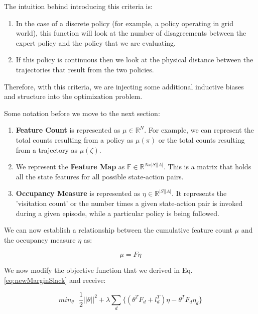 \documentclass[11pt]{article}
\begin{document}
The intuition behind introducing this criteria is:

\begin{enumerate}
    \item In the case of a discrete policy (for example, a policy operating in grid world), this function will look at the number of disagreements between the expert policy and the policy that we are evaluating.
    \item If this policy is continuous then we look at the physical distance between the trajectories that result from the two policies.
\end{enumerate}
 
Therefore, with this criteria, we are injecting some additional inductive biases and structure into the optimization problem.

Some notation before we move to the next section:

\begin{enumerate}
    \item \textbf{Feature Count} is represented as $\mu \in \mathbb{R}^N$. For example, we can represent the total counts resulting from a policy as $\mu(\pi)$ or the total counts resulting from a trajectory as $\mu(\zeta)$.
    \item We represent the \textbf{Feature Map} as $\mathbb{F} \in \mathbb{R}^{N x |S||A|}$. This is a matrix that holds all the state features for all possible state-action pairs.
    \item \textbf{Occupancy Measure} is represented as $\eta \in \mathbb{R}^{|S||A|}$. It represents the 'visitation count' or the number times a given state-action pair is invoked during a given episode, while a particular policy is being followed.
\end{enumerate}

We can now establish a relationship between the cumulative feature count $\mu$ and the occupancy measure $\eta$ as:

\begin{equation}
    \mu = F \eta
\end{equation}

We now modify the objective function that we derived in Eq. \ref{eq:newMarginSlack} and receive:

\begin{equation}
    min_{\theta} \texttt{ } \dfrac{1}{2}||\theta||^2 + \lambda \sum_{d}\{(\theta^T F_d + l_d^T)\eta - \theta^T F_d \eta_d\}
\label{eq:newNewMarginSlack}\end{equation}
\end{document}
